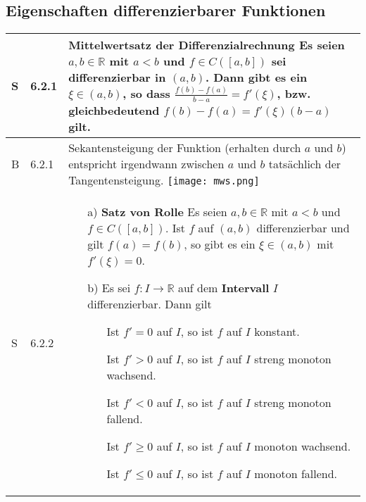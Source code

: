 \subsection{Eigenschaften differenzierbarer Funktionen}

    \begin{longtable}{p{0.75cm} p{1cm} p{16cm}}
        \toprule
        S   & 6.2.1 &   \textbf{Mittelwertsatz der Differenzialrechnung} \hfill \break
                        Es seien $a,b \in \mathbb{R}$ mit $a < b$ und $f \in C([a,b])$ sei differenzierbar in $(a,b)$. Dann gibt es ein
                        $\xi \in (a,b)$, so dass $\frac{f(b)-f(a)}{b-a} = f'(\xi)$, bzw. gleichbedeutend $f(b) - f(a) = f'(\xi)(b-a)$ gilt. \\
        \midrule
        B   & 6.2.1 &   Sekantensteigung der Funktion (erhalten durch $a$ und $b$) entspricht irgendwann zwischen $a$ und $b$ tatsächlich
                        der Tangentensteigung. \hfill \break
                        \texttt{[image: mws.png]} \\
        \midrule
        S   & 6.2.2 &   \begin{itemize}[topsep=-0.5cm]
                            \item[a)] \textbf{Satz von Rolle} \hfill \break
                                        Es seien $a, b \in \mathbb{R}$ mit $a < b$ und $f \in C([a,b])$. Ist $f$ auf $(a,b)$ differenzierbar
                                        und gilt $f(a) = f(b)$, so gibt es ein $\xi \in (a,b)$ mit $f'(\xi) = 0$.
                            \item[b)] Es sei $f: I \rightarrow \mathbb{R}$ auf dem \textbf{Intervall} $I$ differenzierbar. Dann gilt
                                        \begin{itemize}[topsep=-0.5cm]
                                            \item[] Ist $f' = 0$ auf $I$, so ist $f$ auf $I$ konstant.
                                            \item[] Ist $f' > 0$ auf $I$, so ist $f$ auf $I$ streng monoton wachsend.
                                            \item[] Ist $f' < 0$ auf $I$, so ist $f$ auf $I$ streng monoton fallend.
                                            \item[] Ist $f' \geq 0$ auf $I$, so ist $f$ auf $I$ monoton wachsend.
                                            \item[] Ist $f' \leq 0$ auf $I$, so ist $f$ auf $I$ monoton fallend.

\end{itemize}
\end{itemize}
\end{longtable}
